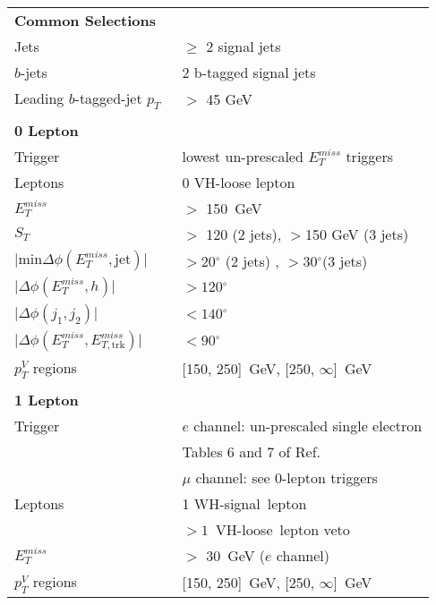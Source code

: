 \begin{table}[h]
\begin{center}
\begin{tabular}{l l} 

\toprule
\multicolumn{2}{l}{\textbf{Common Selections}}\\
Jets & $\geq$  2 signal jets  \\
$b$-jets &  2 b-tagged signal jets \\
Leading $b$-tagged-jet $p_T$\  & $>$ 45 GeV \\
  &\\
\multicolumn{2}{l}{\textbf{0 Lepton}} \\
Trigger & lowest un-prescaled $E_T^{miss}$ triggers \\
Leptons & 0 VH-loose lepton \\
$E_T^{miss}$ & $>$ 150~GeV  \\
$S_T$ & $>$ 120 (2 jets), $>$150 GeV (3 jets)  \\
$\lvert \text{min} \Delta \phi (E_T^{miss}, \text{jet}) \rvert$ & $> 20\ensuremath{^\circ}$ (2 jets) , $> 30\ensuremath{^\circ}$(3 jets) \\
  $\lvert \Delta\phi(E_T^{miss}, h) \rvert$ & $> 120\ensuremath{^\circ}$ \\
$\lvert \Delta\phi(j_1, j_2) \rvert$ & $< 140\ensuremath{^\circ}$ \\
$\lvert \Delta\phi(E_T^{miss}, E_{T, \text{trk}}^{miss}) \rvert$ & $< 90\ensuremath{^\circ}$ \\
$p_T^V$ regions & [150, 250]~GeV, [250, $\infty$]~GeV  \\

&\\
\multicolumn{2}{l}{\textbf{1 Lepton}} \\
Trigger &  $e$ channel: un-prescaled single electron \\
        & Tables 6 and 7 of Ref.~\cite{VHobjectsupportnote}\\
	    & $\mu$ channel: see 0-lepton triggers \\
Leptons & 1 WH-signal\ lepton \\
        &  $>1$~VH-loose\ lepton veto \\
$E_T^{miss}$   & $>$ 30~GeV ($e$ channel) \\
$p_T^{V}$ regions & [150, 250]~GeV, [250, $\infty$]~GeV  \\ 



\end{tabular}
\end{center}
\end{table}
